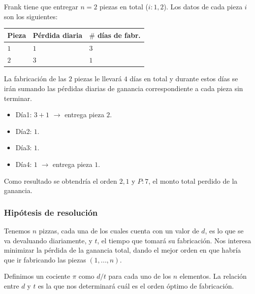 \documentclass[11pt, a4paper, twoside]{article}
\begin{document}
\begin{ejemplo}\hspace{1em}

	Frank tiene que entregar $n=2$ piezas en total ($i:1,2$). Los datos de cada pieza $i$ son los siguientes: \\

	\begin{center}
		\begin{tabular}{|l|l|l|}
			\hline
			Pieza &  Pérdida diaria & $\#$ días de fabr.\\
			\hline
			$1$   &     $1$         & $3$               \\
			\hline 
			$2$   &     $3$         & $1$               \\
			\hline 
		\end{tabular}
	\end{center}
	    
	La fabricación de las $2$ piezas le llevará $4$ días en total y durante estos días se irán sumando las pérdidas 
	diarias de ganancia correspondiente a cada pieza sin terminar. 

	\begin{itemize}[leftmargin=+6em]
		\item Día1: $3+1$ $\rightarrow$ entrega pieza $2$. 
		\item Día2: $1$. 
		\item Día3: $1$.
		\item Día4: $1$ $\rightarrow$ entrega pieza $1$.
	\end{itemize}  	
		
	Como resultado se obtendría el orden $2,1$ y $P:7$, el monto total perdido de la ganancia. 


\end{ejemplo}

\subsubsection{Hipótesis de resolución}

Tenemos $n$ pizzas, cada una de los cuales cuenta con un valor de $d$, es lo que
se va devaluando diariamente, y $t$, el tiempo que tomará su fabricación. Nos
interesa minimizar la pérdida de la ganancia total, dando el mejor orden en que
habría que ir fabricando las piezas $(1,...,n)$.

Definimos un cociente $\pi$ como $d/t$ para cada uno de los $n$ elementos. La
relación entre $d$ y $t$ es la que nos determinará cuál es el orden óptimo de
fabricación.
\end{document}

